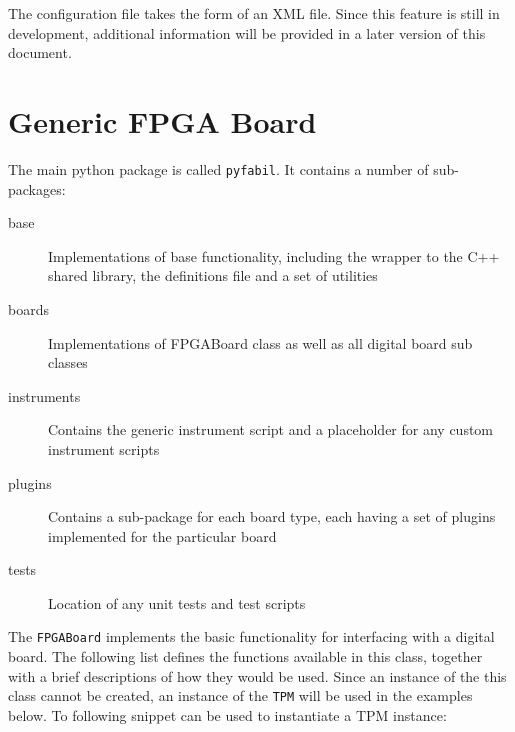 \documentclass[a4paper,11pt]{article}
\begin{document}
The configuration file takes the form of an XML file. Since this feature is 
still in development, additional information will be provided in a later 
version of this document.

\section{Generic FPGA Board}

The main python package is called \texttt{pyfabil}. It contains a number of 
sub-packages:
\begin{description}
 \item[base] Implementations of base functionality, including the wrapper to 
the C++ shared library, the definitions file and a set of utilities
 \item[boards] Implementations of FPGABoard class as well as all digital board 
sub classes
 \item[instruments] Contains the generic instrument script and a placeholder 
for any custom instrument scripts 
 \item[plugins] Contains a sub-package for each board type, each having a set 
of plugins implemented for the particular board
 \item[tests] Location of any unit tests and test scripts
\end{description}

The \texttt{FPGABoard} implements the basic functionality for interfacing with 
a digital board. The following list defines the functions available in this 
class, together with a brief descriptions of how they would be used. Since an 
instance of the this class cannot be created, an instance of the \texttt{TPM} 
will be used in the examples below. To following snippet can be used to 
instantiate a TPM instance:


\end{document}
